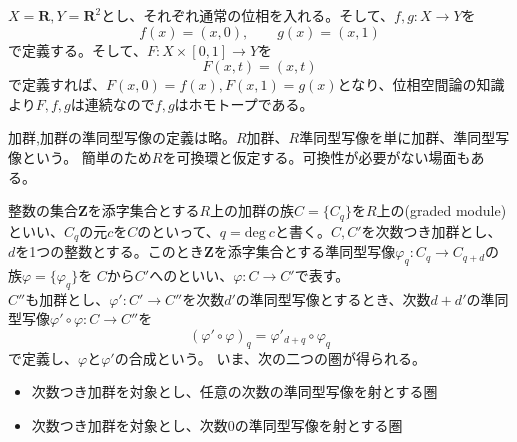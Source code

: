 \documentclass[dvipdfmx,a4paper,11pt]{jsarticle}
\begin{document}
\clearpage

\begin{tcolorbox}[title = ホモトープな例,colbacktitle = lime!80!black]
  $X=\mathbf{R},Y=\mathbf{R}^2$とし、それぞれ通常の位相を入れる。そして、$f,g:X\to Y$を
  \begin{equation*}
    f(x)=(x,0),\qquad g(x)=(x,1)
  \end{equation*}
  で定義する。そして、$F:X\times [0,1]\to Y$を
  \begin{equation*}
    F(x,t)=(x,t)
  \end{equation*}
  で定義すれば、$F(x,0)=f(x),F(x,1)=g(x)$となり、位相空間論の知識より$F,f,g$は連続なので$f,g$はホモトープである。
\end{tcolorbox}

加群,加群の準同型写像の定義は略。$R$加群、$R$準同型写像を単に加群、準同型写像という。
簡単のため$R$を可換環と仮定する。可換性が必要がない場面もある。
\begin{tcolorbox}[title = 例2]
  整数の集合$\mathbf{Z}$を添字集合とする$R$上の加群の族$C=\{C_{q}\}$を$R$上の(graded module)
  といい、$C_{q}$の元$c$を$C$のといって、$q=\text{deg}\ c$と書く。$C,C'$を次数つき加群とし、
  $d$を1つの整数とする。このとき$\mathbf{Z}$を添字集合とする準同型写像$\varphi_{q}:C_{q} \to C_{q+d}$の族$\varphi = \{\varphi_{q}\}$を
  $C$から$C'$へのといい、$\varphi : C\to C'$で表す。\\
  $C''$も加群とし、$\varphi' : C'\to C''$を次数$d'$の準同型写像とするとき、次数$d+d'$の準同型写像$\varphi' \circ \varphi : C\to C''$を
  \begin{equation*}
    (\varphi' \circ \varphi)_{q} = \varphi'_{d+q} \circ \varphi_{q}
  \end{equation*} 
  で定義し、$\varphi$と$\varphi'$の合成という。
  いま、次の二つの圏が得られる。
  \begin{itemize}
    \item 次数つき加群を対象とし、任意の次数の準同型写像を射とする圏
    \item 次数つき加群を対象とし、次数$0$の準同型写像を射とする圏
  \end{itemize}
\end{tcolorbox}
\end{document}
